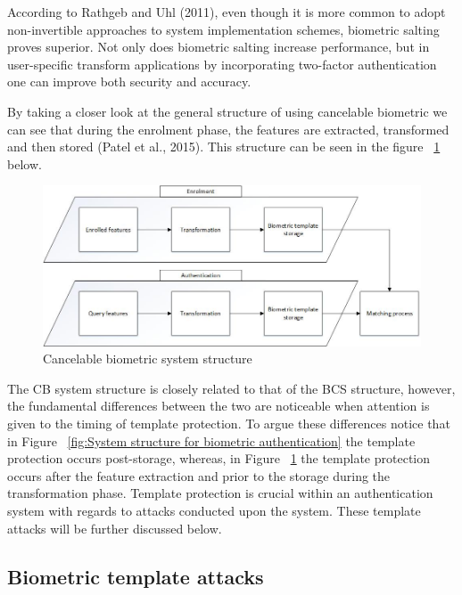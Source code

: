 According to Rathgeb and Uhl (2011), even though it is more common to adopt non-invertible approaches to system implementation schemes, biometric salting proves superior. Not only does biometric salting increase performance, but in user-specific transform applications by incorporating two-factor authentication one can improve both security and accuracy.

By taking a closer look at the general structure of using cancelable biometric we can see that during the enrolment phase, the features are extracted, transformed and then stored (Patel et al., 2015). This structure can be seen in the figure ~\ref{fig:Cancelable biometric system structure} below.


\begin{figure}[htbp!] 
\centering    
\includegraphics[width=1.0\textwidth]{Chapter2/Figs/Cancelable_biometric_system_structure.jpg}
\caption[Cancelable biometric system structure]{Cancelable biometric system structure}
\label{fig:Cancelable biometric system structure}
\end{figure}

The CB system structure is closely related to that of the BCS structure, however, the fundamental differences between the two are noticeable when attention is given to the timing of template protection. To argue these differences notice that in Figure ~\ref{fig:System structure for biometric authentication} the template protection occurs post-storage, whereas, in Figure ~\ref{fig:Cancelable biometric system structure} the template protection occurs after the feature extraction and prior to the storage during the transformation phase. Template protection is crucial within an authentication system with regards to attacks conducted upon the system. These template attacks will be further discussed below.

    \subsection{ Biometric template attacks}
    
